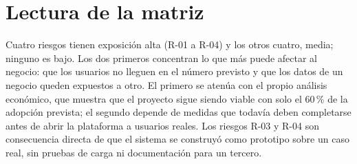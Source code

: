 \section{Lectura de la matriz}

Cuatro riesgos tienen exposición alta (R-01 a R-04) y los otros cuatro,
media; ninguno es bajo. Los dos primeros concentran lo que más puede
afectar al negocio: que los usuarios no lleguen en el número previsto y
que los datos de un negocio queden expuestos a otro. El primero se
atenúa con el propio análisis económico, que muestra que el proyecto
sigue siendo viable con solo el 60\,\% de la adopción prevista; el
segundo depende de medidas que todavía deben completarse antes de abrir
la plataforma a usuarios reales. Los riesgos R-03 y R-04 son
consecuencia directa de que el sistema se construyó como prototipo
sobre un caso real, sin pruebas de carga ni documentación para un
tercero.

